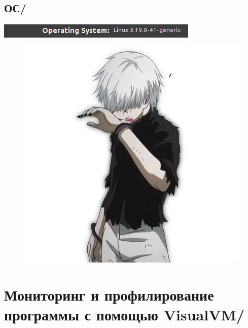 \subsection{ОС/}
\includegraphics{img/Ex2pics/OS}

\begin{figure}[H]
    \centering
    \includegraphics[scale=0.4]{img/ghoul}
\end{figure}


\newpage

\thispagestyle{empty}

\BgThispage


\section{Мониторинг и профилирование программы с помощью VisualVM/}

